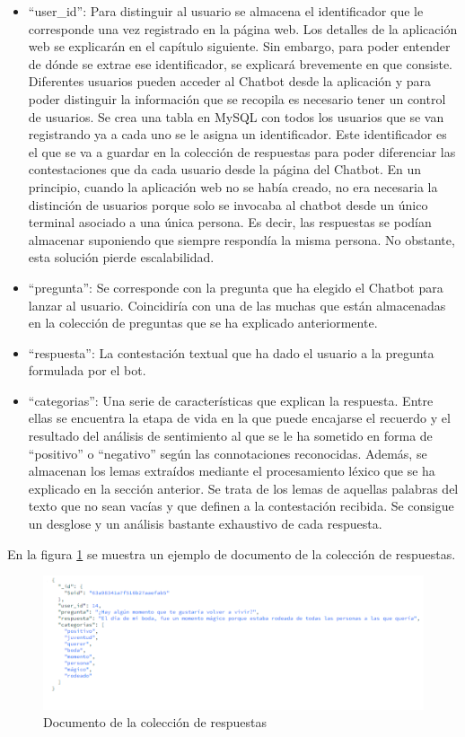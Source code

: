 \begin{itemize}
	\item ``user\_id'': Para distinguir al usuario se almacena el identificador que le corresponde una vez registrado en la página web. Los detalles de la aplicación web se explicarán en el capítulo siguiente. Sin embargo, para poder entender de dónde se extrae ese identificador, se explicará brevemente en que consiste. Diferentes usuarios pueden acceder al Chatbot desde la aplicación y para poder distinguir la información que se recopila es necesario tener un control de usuarios. Se crea una tabla en MySQL con todos los usuarios que se van registrando ya a cada uno se le asigna un identificador. Este identificador es el que se va a guardar en la colección de respuestas para poder diferenciar las contestaciones que da cada usuario desde la página del Chatbot. En un principio, cuando la aplicación web no se había creado, no era necesaria la distinción de usuarios porque solo se invocaba al chatbot desde un único terminal asociado a una única persona. Es decir, las respuestas se podían almacenar suponiendo que siempre respondía la misma persona. No obstante, esta solución pierde escalabilidad. 
	\item ``pregunta'': Se corresponde con la pregunta que ha elegido el Chatbot para lanzar al usuario. Coincidiría con una de las muchas que están almacenadas en la colección de preguntas que se ha explicado anteriormente. 
	\item ``respuesta'': La contestación textual que ha dado el usuario a la pregunta formulada por el bot. 
	\item ``categorias'': Una serie de características que explican la respuesta. Entre ellas se encuentra la etapa de vida en la que puede encajarse el recuerdo y el resultado del análisis de sentimiento al que se le ha sometido en forma de ``positivo'' o ``negativo'' según las connotaciones reconocidas. Además, se almacenan los lemas extraídos mediante el procesamiento léxico que se ha explicado en la sección anterior. Se trata de los lemas de aquellas palabras del texto que no sean vacías y que definen a la contestación recibida. Se consigue un desglose y un análisis bastante exhaustivo de cada respuesta. 
\end{itemize}

En la figura \ref{fig:mongo_resp} se muestra un ejemplo de documento de la colección de respuestas.

\begin{figure}[h]
	\centering
	\includegraphics[scale=1.0]{Imagenes/Vectorial/mongo_respuesta}
	\caption{Documento de la colección de respuestas}
	\label{fig:mongo_resp}
\end{figure}


